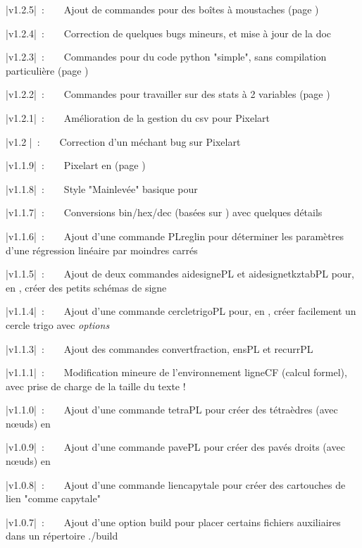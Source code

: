 \documentclass{article}
\newcommand\ctex[1]{\tcbox[vignettelatex]{#1}}
\begin{document}
{\small \bverb|v1.2.5|~:~~~~Ajout de commandes pour des boîtes à moustaches (page \pageref{boiteamoustaches})

{\small \bverb|v1.2.4|~:~~~~Correction de quelques bugs mineurs, et mise à jour de la doc

{\small \bverb|v1.2.3|~:~~~~Commandes pour du code python "simple", sans compilation particulière (page \pageref{pythonsimple})

{\small \bverb|v1.2.2|~:~~~~Commandes pour travailler sur des stats à 2 variables (page \pageref{statsdeuxvars})

{\small \bverb|v1.2.1|~:~~~~Amélioration de la gestion du csv pour Pixelart

{\small \bverb|v1.2  |~:~~~~Correction d'un méchant bug sur Pixelart

{\small \bverb|v1.1.9|~:~~~~Pixelart en \TikZ{} (page \pageref{pixelart})

{\small \bverb|v1.1.8|~:~~~~Style "Mainlevée" basique pour \TikZ

{\small \bverb|v1.1.7|~:~~~~Conversions bin/hex/dec (basées sur \ctex{xintbinhex}) avec quelques détails

{\small \bverb|v1.1.6|~:~~~~Ajout d'une commande \textsf{PLreglin} pour déterminer les paramètres d'une régression linéaire par moindres carrés

{\small \bverb|v1.1.5|~:~~~~Ajout de deux commandes \textsf{aidesignePL} et \textsf{aidesignetkztabPL} pour, en \TikZ, créer des petits schémas \og de signe \fg

{\small \bverb|v1.1.4|~:~~~~Ajout d'une commande \textsf{cercletrigoPL} pour, en \TikZ, créer facilement un cercle trigo avec \textit{options}

{\small \bverb|v1.1.3|~:~~~~Ajout des commandes \textsf{convertfraction}, \textsf{ensPL} et \textsf{recurrPL}

{\small \bverb|v1.1.1|~:~~~~Modification mineure de l'environnement \textsf{ligneCF} (calcul formel), avec prise de charge de la taille du texte !

{\small \bverb|v1.1.0|~:~~~~Ajout d'une commande \textsf{tetraPL} pour créer des tétraèdres (avec nœuds) en \TikZ

{\small \bverb|v1.0.9|~:~~~~Ajout d'une commande \textsf{pavePL} pour créer des pavés droits (avec nœuds) en \TikZ

{\small \bverb|v1.0.8|~:~~~~Ajout d'une commande \textsf{liencapytale} pour créer des cartouches de lien "comme capytale"

{\small \bverb|v1.0.7|~:~~~~Ajout d'une option \textsf{build} pour placer certains fichiers auxiliaires dans un répertoire \textsf{./build}

}}}}}}}}}}}}}}}}}}
\end{document}

